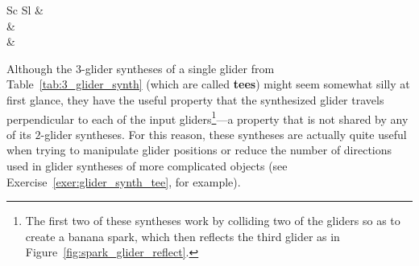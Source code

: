 \begin{table}[!htbp]
\begin{center}
\begin{tabular}{Sc Sl}
			  &  \\
			
			 &  \\
			
			  &  \\\bottomrule
		\end{tabular}
		\caption{A selection of useful $3$-glider syntheses. The $3$-glider collision that creates a glider-producing switch engine is not a true glider synthesis due to the fact that it also creates a wide assortment of other debris, but it is nonetheless noteworthy for being the only known way of generating infinite growth with just $3$ gliders.}\label{tab:3_glider_synth}
	\end{center}
\end{table}

Although the $3$-glider syntheses of a single glider from Table~\ref{tab:3_glider_synth} (which are called \textbf{tees}) might seem somewhat silly at first glance, they have the useful property that the synthesized glider travels perpendicular to each of the input gliders\footnote{The first two of these syntheses work by colliding two of the gliders so as to create a banana spark, which then reflects the third glider as in Figure~\ref{fig:spark_glider_reflect}.}---a property that is not shared by any of its $2$-glider syntheses. For this reason, these syntheses are actually quite useful when trying to manipulate glider positions or reduce the number of directions used in glider syntheses of more complicated objects (see Exercise~\ref{exer:glider_synth_tee}, for example).

